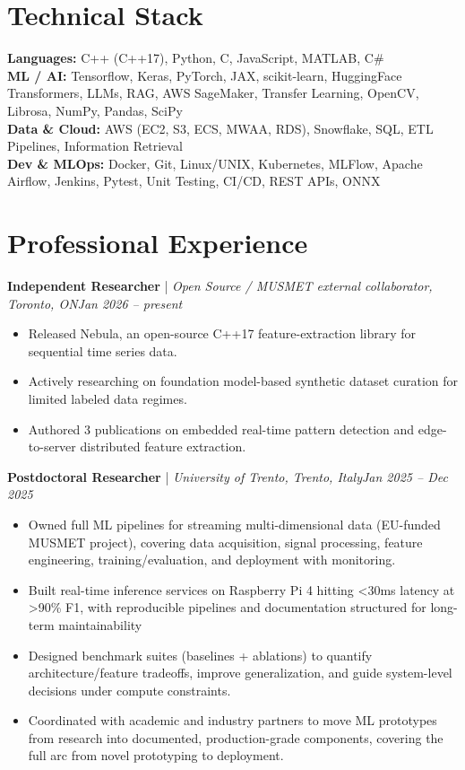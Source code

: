 \documentclass[11pt]{article}
\newenvironment{cvrole}[5]{%
  \par\noindent\textbf{\large #1} | \textit{\small #2, #3}\hfill \textit{\small #4 -- #5}\par
  \begin{itemize}[leftmargin=2em, itemsep=-0.3em, topsep=-0.5em]%
}{%
  \end{itemize}\par\noindent\mbox{}\par\vspace{0.1em}%
}
\begin{document}
\section*{Technical Stack}
\textbf{Languages:} C++ (C++17), Python, C, JavaScript, MATLAB, C\#\\
\textbf{ML / AI:} Tensorflow, Keras, PyTorch, JAX, scikit-learn, HuggingFace Transformers, LLMs, RAG, AWS SageMaker, Transfer Learning, OpenCV, Librosa, NumPy, Pandas, SciPy\\
\textbf{Data \& Cloud:} AWS (EC2, S3, ECS, MWAA, RDS), Snowflake, SQL, ETL Pipelines, Information Retrieval\\
\textbf{Dev \& MLOps:} Docker, Git, Linux/UNIX, Kubernetes, MLFlow, Apache Airflow, Jenkins, Pytest, Unit Testing, CI/CD, REST APIs, ONNX

\section*{Professional Experience}
\begin{cvrole}{Independent Researcher}{Open Source / MUSMET external collaborator}{Toronto, ON}{Jan 2026}{present}
    \item Released Nebula, an open-source C++17 feature-extraction library for sequential time series data.
    \item Actively researching on foundation model-based synthetic dataset curation for limited labeled data regimes.
    \item Authored 3 publications on embedded real-time pattern detection and edge-to-server distributed feature extraction.
\end{cvrole}

\begin{cvrole}{Postdoctoral Researcher}{University of Trento}{Trento, Italy}{Jan 2025}{Dec 2025}
    \item Owned full ML pipelines for streaming multi-dimensional data (EU-funded MUSMET project), covering data acquisition, signal processing, feature engineering, training/evaluation, and deployment with monitoring.
    \item Built real-time inference services on Raspberry Pi 4 hitting <30ms latency at >90\% F1, with reproducible pipelines and documentation structured for long-term maintainability
    \item Designed benchmark suites (baselines + ablations) to quantify architecture/feature tradeoffs, improve generalization, and guide system-level decisions under compute constraints.
    \item Coordinated with academic and industry partners to move ML prototypes from research into documented, production-grade components, covering the full arc from novel prototyping to deployment.
\end{cvrole}
\end{document}

